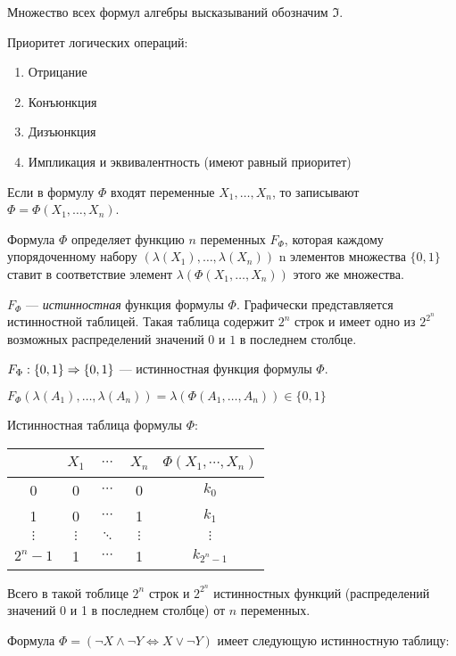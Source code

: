 Множество всех формул алгебры высказываний обозначим $\mathfrak I$.

Приоритет логических операций:
\begin{enumerate}
    \item Отрицание
    \item Конъюнкция
    \item Дизъюнкция
    \item Импликация и эквивалентность (имеют равный приоритет)
\end{enumerate}

Если в формулу $\Phi$ входят переменные $X_1, \dots, X_n$, то записывают $\Phi = \Phi(X_1, \dots, X_n)$.

Формула $\Phi$ определяет функцию $n$ переменных $F_\Phi$, которая каждому упорядоченному набору $(\lambda(X_1), \dots, \lambda(X_n))$  n элементов множества $\{0, 1\}$ ставит в соответствие элемент $\lambda(\Phi(X_1, \dots, X_n))$ этого же множества.

\dftion $F_\Phi$ --- \textit{истинностная} функция формулы $\Phi$. Графически представляется истинностной таблицей. Такая таблица содержит $2^n$ строк и имеет одно из $2^{2^n}$ возможных распределений значений $0$ и $1$ в последнем столбце.

$F_\Phi: \{0, 1\} \Rightarrow \{0, 1\}$ --- истинностная функция формулы $\Phi$.

$F_\Phi(\lambda(A_1), \dots, \lambda(A_n)) = \lambda(\Phi(A_1, \dots, A_n)) \in \{0, 1\}$

Истинностная таблица формулы $\Phi$:

\begin{tabular}{|ccccc|}
    \hline
    ~         & $X_1$    & $\cdots$ & $X_n$    & $\Phi(X_1, \cdots, X_n)$ \\
    \hline
    0         & 0        & $\cdots$ & 0        & $k_0$ \\
    1         & 0        & $\cdots$ & 1        & $k_1$ \\
    $\vdots$  & $\vdots$ & $\ddots$ & $\vdots$ & $\vdots$ \\
    $2^n - 1$ & 1        & $\cdots$ & 1        & $k_{2^n - 1}$ \\
    \hline
\end{tabular}

Всего в такой тоблице $2^n$ строк и $2^{2^n}$ истинностных функций (распределений значений 0 и 1 в последнем столбце) от $n$ переменных.

\ex Формула $\Phi=(\lnot X \land \lnot Y \Leftrightarrow X \lor \lnot Y)$ имеет следующую истинностную таблицу:

